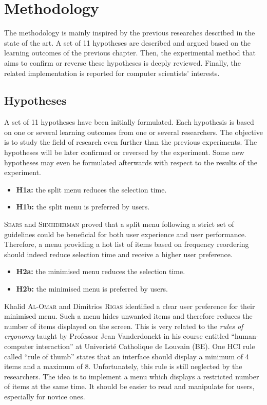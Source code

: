 \chapter{Methodology}
The methodology is mainly inspired by the previous researches described in the 
state of the art. A set of 11 hypotheses are described and argued based on the 
learning outcomes of the previous chapter. Then, the experimental method that 
aims to confirm or reverse these hypotheses is deeply reviewed. Finally, the 
related implementation is reported for computer scientists’ interests.

\section{Hypotheses} \label{hypotheses}
A set of 11 hypotheses have been initially formulated. Each hypothesis is based 
on one or several learning outcomes from one or several researchers. The 
objective is to study the field of research even further than the previous 
experiments. The hypotheses will be later confirmed or reversed by the 
experiment. Some new hypotheses may even be formulated afterwards with respect 
to the results of the experiment.

\begin{itemize}
 \item \textbf{H1a:} the split menu reduces the selection time.
 \item \textbf{H1b:} the split menu is preferred 
by users.
\end{itemize}

\textsc{Sears} and \textsc{Shneiderman} proved that a split menu following a 
strict set of 
guidelines could be beneficial for both user experience and user performance. 
Therefore, a menu providing a hot list of items based on frequency reordering 
should indeed reduce selection time and receive a higher user 
preference.

\begin{itemize}
  \item \textbf{H2a:} the minimised menu reduces the selection time.
  \item \textbf{H2b:} the minimised menu is preferred by users.
\end{itemize}

Khalid \textsc{Al-Omar} and Dimitrios \textsc{Rigas} identified a clear user 
preference for their minimised menu. Such a menu hides unwanted items and 
therefore reduces the number of items displayed on the screen. This is very 
related to the \textit{rules of ergonomy} taught by Professor Jean Vanderdonckt 
in his course entitled \enquote{human-computer interaction} at Univeristé 
Catholique de Louvain (BE). One HCI rule called \enquote{rule of thumb} states 
that an interface should display a minimum of 4 items and a maximum of 8. 
Unfortunately, this rule is still neglected by the researchers. The idea is to 
implement a menu which displays a restricted number of items at the same time. 
It should be easier to read and manipulate for users, especially for novice 
ones.


